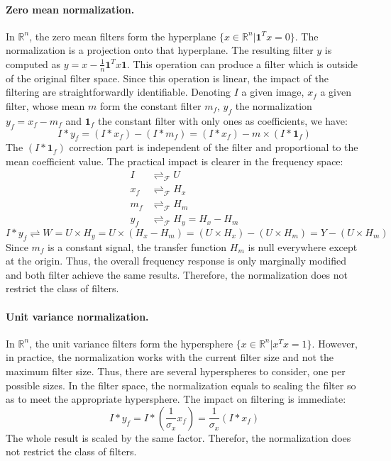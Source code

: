 \documentclass[a4paper]{report}
\begin{document}
			\paragraph{Zero mean normalization.}
			In $\mathbb{R}^n$, the zero mean filters form the hyperplane $\{x \in \mathbb{R}^n | \textbf{1}^{T}x = 0\}$. The normalization is a projection onto that hyperplane. The resulting filter $y$ is computed as $y = x - \frac{1}{n}\textbf{1}^{T}x\textbf{1}$. This operation can produce a filter which is outside of the original filter space.
			Since this operation is linear, the impact of the filtering are straightforwardly identifiable. Denoting $I$ a given image, $x_f$ a given filter, whose mean $m$ form the constant filter $m_f$, $y_f$ the normalization $ y_f = x_f - m_f$ and $\textbf{1}_f$ the constant filter with only ones as coefficients, we have: 
			\[
				I * y_f = (I * x_f) - (I * m_f) = (I * x_f) - m \times (I * \textbf{1}_f)
			\]
			The $(I * \textbf{1}_f)$ correction part is independent of the filter and proportional to the mean coefficient value. The practical impact is clearer in the frequency space: 
			\begin{align*}
				I &\rightleftharpoons_\mathcal{F} U \\
				x_f &\rightleftharpoons_\mathcal{F} H_x \\
				m_f &\rightleftharpoons_\mathcal{F} H_m \\
				y_f &\rightleftharpoons_\mathcal{F} H_y = H_x - H_m
			\end{align*}
			\[
				I * y_f \rightleftharpoons W = U \times H_y = U \times (H_x - H_m) = (U \times H_x) - (U \times H_m) = Y - (U \times H_m)
			\]
			Since $m_f$ is a constant signal, the transfer function $H_m$ is null everywhere except at the origin. Thus, the overall frequency response is only marginally modified and both filter achieve the same results.
			Therefore, the normalization does not restrict the class of filters.
			
			\paragraph{Unit variance normalization.}
			In $\mathbb{R}^n$, the unit variance filters form the hypersphere $\{x \in \mathbb{R}^n | x^{T}x = 1\}$. However, in practice, the normalization works with the current filter size and not the maximum filter size. Thus, there are several hyperspheres to consider, one per possible sizes. 
			In the filter space, the normalization equals to scaling the filter so as to meet the appropriate hypersphere. The impact on filtering is immediate:
			\[
				I * y_f = I * (\frac{1}{\sigma_x} x_f) = \frac{1}{\sigma_x} (I * x_f)
			\]
			The whole result is scaled by the same factor. Therefor, the normalization does not restrict the class of filters.
			
\end{document}
